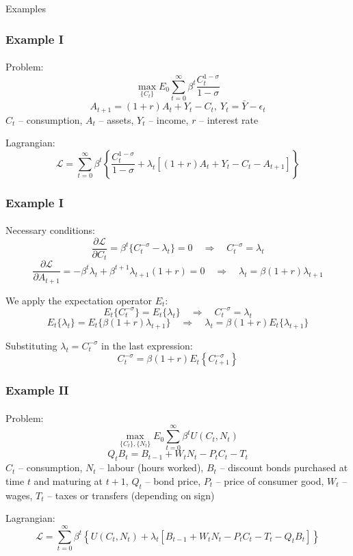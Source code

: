\documentclass[10pt]{beamer}
\theoremstyle{definition}
\begin{document}
\begin{section}{Examples}\label{sec:ex}

\begin{frame}
\frametitle{Example I}
\framesubtitle{}
Problem:
\[ \max_{\{C_t\}} E_0 \sum_{t=0}^{\infty}\beta^t \frac{C_t^{1-\sigma}}{1-\sigma} \]
\[ A_{t+1}=(1+r)A_t + Y_t - C_t,~Y_t=\bar{Y}-\epsilon_t \]
$ C_t $ -- consumption, $ A_t $ -- assets, $ Y_t $ -- income, $ r $ -- interest rate \bigskip

Lagrangian:\[ \mathcal{L} = \sum_{t=0}^{\infty}\beta^t \left\{\frac{C_t^{1-\sigma}}{1-\sigma}+\lambda_t \left[(1+r)A_t + Y_t - C_t - A_{t+1}\right] \right\} \]
\end{frame}




\begin{frame}
\frametitle{Example I}
\framesubtitle{}
Necessary conditions:
\[ \frac{\partial \mathcal{L} }{\partial C_t} = \beta^t \{C_t^{-\sigma}-\lambda_t\} = 0 \quad\Longrightarrow\quad C_t^{-\sigma}=\lambda_t \]
\[ \frac{\partial \mathcal{L} }{\partial A_{t+1}} = -\beta^t \lambda_t + \beta^{t+1}\lambda_{t+1}(1+r) = 0 \quad\Longrightarrow\quad \lambda_t = \beta(1+r)\lambda_{t+1} \]

We apply the expectation operator $ E_t $:
\[ E_t \{C_t^{-\sigma}\}=E_t \{\lambda_t\} \quad\Longrightarrow\quad C_t^{-\sigma}=\lambda_t \]
\[ E_t \{\lambda_t\} = E_t\{\beta(1+r)\lambda_{t+1}\} \quad\Longrightarrow\quad \lambda_t = \beta(1+r)E_t\{\lambda_{t+1}\} \]

Substituting $ \lambda_t = C_t^{-\sigma} $ in the last expression:
\[ C_t^{-\sigma} = \beta (1+r)E_t \left\{C_{t+1}^{-\sigma}\right\} \] %
\end{frame}


\begin{frame}
\frametitle{Example II}
\framesubtitle{}
Problem:
\[ \max_{\{C_t\},\{N_t\}} E_0 \sum_{t=0}^{\infty}\beta^t U(C_t,N_t) \]
\[ Q_t B_t = B_{t-1} + W_t N_t - P_t C_t - T_t  \]
$ C_t $ -- consumption, $ N_t $ -- labour (hours worked), $ B_t $ -- discount bonds purchased at time $ t $ and maturing at $ t+1 $, $ Q_t $ -- bond price, $ P_t $ -- price of consumer good, $ W_t $ -- wages, $ T_t $ -- taxes or transfers (depending on sign) \bigskip

Lagrangian:\[ \mathcal{L} = \sum_{t=0}^{\infty}\beta^t \left\{U(C_t,N_t)+\lambda_t \left[ B_{t-1} + W_t N_t - P_t C_t - T_t - Q_t B_t \right] \right\} \]
\end{frame}





\end{section}
\end{document}
